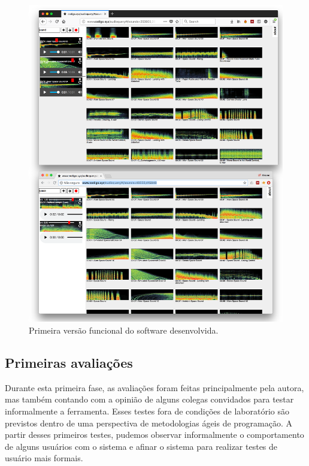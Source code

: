\begin{figure}

\includegraphics[width=1\textwidth]{pictures/cap4/audioquery_browsers}
\caption{\label{audiquery}Primeira versão funcional do software desenvolvida.}
\label{fig:audioquery}
\end{figure}

\subsection{Primeiras avaliações}

Durante esta primeira fase, as avaliações foram feitas principalmente pela autora, mas também contando com a opinião de alguns colegas convidados para testar informalmente a ferramenta. Esses testes fora de condições de laboratório são previstos dentro de uma perspectiva de metodologias ágeis de programação. A partir desses primeiros testes, pudemos observar informalmente o comportamento de alguns usuários com o sistema e afinar o sistema para realizar testes de usuário mais formais. 

